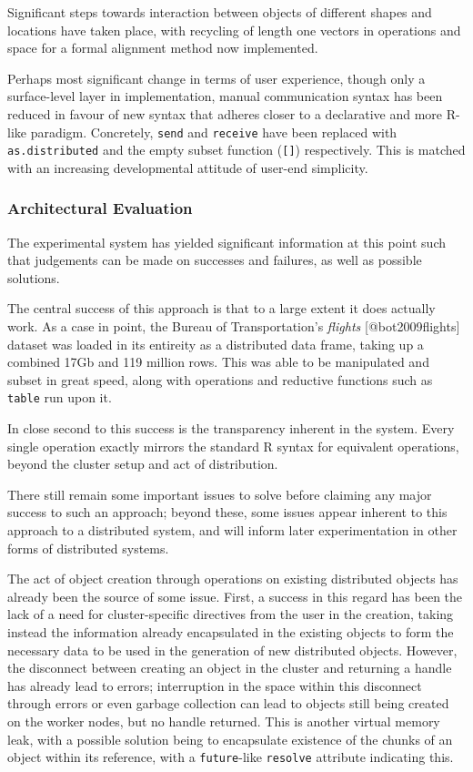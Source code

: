 Significant steps towards interaction between objects of different
shapes and locations have taken place, with recycling of length one
vectors in operations and space for a formal alignment method now
implemented.

Perhaps most significant change in terms of user experience, though only
a surface-level layer in implementation, manual communication syntax has
been reduced in favour of new syntax that adheres closer to a
declarative and more R-like paradigm. Concretely, \texttt{send} and
\texttt{receive} have been replaced with \texttt{as.distributed} and the
empty subset function (\texttt{{[}{]}}) respectively. This is matched
with an increasing developmental attitude of user-end simplicity.

\hypertarget{sec:eval}{%
\subsubsection{Architectural Evaluation}\label{sec:eval}}

The experimental system has yielded significant information at this
point such that judgements can be made on successes and failures, as
well as possible solutions.

The central success of this approach is that to a large extent it does
actually work. As a case in point, the Bureau of Transportation's
\emph{flights} {[}@bot2009flights{]} dataset was loaded in its entireity
as a distributed data frame, taking up a combined 17Gb and 119 million
rows. This was able to be manipulated and subset in great speed, along
with operations and reductive functions such as \texttt{table} run upon
it.

In close second to this success is the transparency inherent in the
system. Every single operation exactly mirrors the standard R syntax for
equivalent operations, beyond the cluster setup and act of distribution.

There still remain some important issues to solve before claiming any
major success to such an approach; beyond these, some issues appear
inherent to this approach to a distributed system, and will inform later
experimentation in other forms of distributed systems.

The act of object creation through operations on existing distributed
objects has already been the source of some issue. First, a success in
this regard has been the lack of a need for cluster-specific directives
from the user in the creation, taking instead the information already
encapsulated in the existing objects to form the necessary data to be
used in the generation of new distributed objects. However, the
disconnect between creating an object in the cluster and returning a
handle has already lead to errors; interruption in the space within this
disconnect through errors or even garbage collection can lead to objects
still being created on the worker nodes, but no handle returned. This is
another virtual memory leak, with a possible solution being to
encapsulate existence of the chunks of an object within its reference,
with a \texttt{future}-like \texttt{resolve} attribute indicating this.

